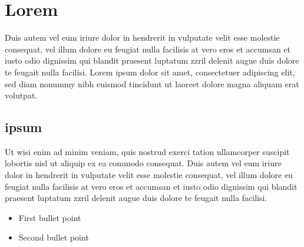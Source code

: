 \section{Lorem}
Duis autem vel eum iriure dolor in hendrerit in vulputate velit esse molestie consequat, vel illum dolore eu feugiat nulla facilisis at vero eros et accumsan et iusto odio dignissim qui blandit praesent luptatum zzril delenit augue duis dolore te feugait nulla facilisi. Lorem ipsum dolor sit amet, consectetuer adipiscing elit, sed diam nonummy nibh euismod tincidunt ut laoreet dolore magna aliquam erat volutpat.

\subsection{ipsum}
Ut wisi enim ad minim veniam, quis nostrud exerci tation ullamcorper suscipit lobortis nisl ut aliquip ex ea commodo consequat. Duis autem vel eum iriure dolor in hendrerit in vulputate velit esse molestie consequat, vel illum dolore eu feugiat nulla facilisis at vero eros et accumsan et iusto odio dignissim qui blandit praesent luptatum zzril delenit augue duis dolore te feugait nulla facilisi.


\begin{itemize}
    \item First bullet point
    \item Second bullet point
\end{itemize}


